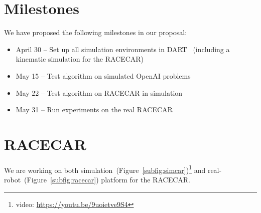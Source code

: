 \documentclass{article}
\newcommand{\figref}[1]{Figure~\ref{#1}}%
\begin{document}
\section{Milestones}
We have proposed the following milestones in our proposal:
\begin{itemize}
\item April 30 -- Set up all simulation environments in DART~\cite{lee2018dart} (including a kinematic simulation for the RACECAR)
\item May 15   -- Test algorithm on simulated OpenAI problems
\item May 22   -- Test algorithm on RACECAR in simulation
\item May 31   -- Run experiments on the real RACECAR
\end{itemize}

\section{RACECAR}
We are working on both simulation~(\figref{subfig:simcar})\footnote{video: \url{https://youtu.be/9uoietve9S4}} and real-robot~(\figref{subfig:racecar}) platform for the RACECAR.
\end{document}
